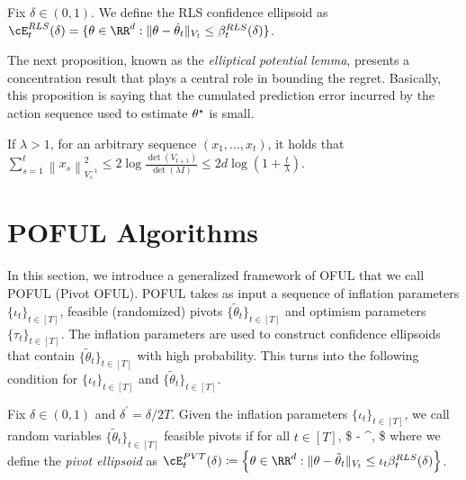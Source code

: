 \begin{definition}
	\label{def:rls}
	Fix $\delta\in (0,1)$. We define the RLS confidence ellipsoid as	$
	\cE_t^{RLS}(\delta)  = \{\theta \in \RR^d: \|\theta - \hparam_t\|_{V_t}\leq \beta_t^{RLS}(\delta) \}$.

\end{definition}


The next proposition, known as the \emph{elliptical potential lemma}, presents a concentration result that plays a central role in bounding the regret. Basically, this proposition is saying that the cumulated prediction error incurred by the action sequence used to estimate $\theta^\star$ is small.
\begin{proposition} \label{prop:potential}
	If $\lambda >1$, for an arbitrary sequence $(x_1,\dots,x_t)$, it holds that
	$
	\sum_{s=1}^t\left\|x_s\right\|_{V_s^{-1}}^2 \leq 2 \log \frac{\operatorname{det}\left(V_{t+1}\right)}{\operatorname{det}(\lambda I)} \leq 2 d \log \left(1+\frac{t}{\lambda}\right).
	$

\end{proposition}


\section{POFUL Algorithms}
\label{sec:POFUL}
In this section, we introduce a generalized framework of  OFUL that we call POFUL (Pivot OFUL). POFUL takes as input a sequence of inflation parameters $\{\iota_t\}_{t\in [T]}$,  feasible (randomized) pivots $\{\tilde{\theta}_t\}_{t\in[T]}$ and optimism parameters $\{\tau_t\}_{t\in [T]}$. The inflation parameters are used to construct confidence ellipsoids that contain $\{\tilde{\theta}_t\}_{t\in[T]}$ with high probability. This turns into the following condition for $\{\iota_t\}_{t\in [T]}$ and $\{\tilde{\theta}_t\}_{t\in[T]}$.

\begin{definition} \label{def:tilde_beta}
Fix  $\delta \in (0,1)$ and  $\delta^\prime = \delta/2 T$. Given the inflation parameters $\{\iota_t\}_{t\in [T]}$, we call random variables $\{\tilde{\theta}_t\}_{t\in[T]}$  feasible pivots if for all $t\in[T]$,
\$
	\PP{}  - \delta^\prime,
	\$ where we define the \emph{pivot ellipsoid} as
$
 \cE_t^{\PVT} (\delta) \coloneqq \left \{\theta \in \RR^d: \|\theta - \hparam_t\|_{V_t}\leq \iota_t \beta^{RLS}_t (\delta ) \right\}$.
\end{definition}

